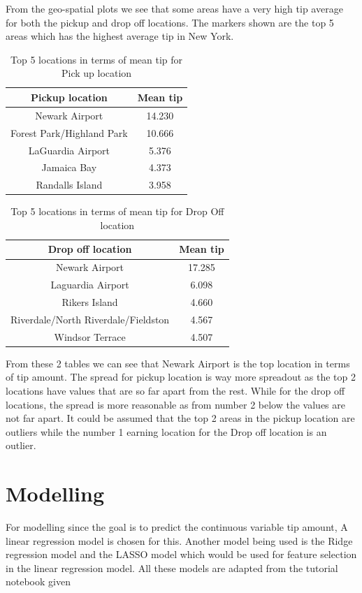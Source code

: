 \documentclass[11pt]{article}
\begin{document}
From the geo-spatial plots we see that some areas have a very high tip average for both the pickup and drop off locations. The markers shown are the top 5 areas which has the highest average tip in New York.

\begin{table}[h!]
\centering
\begin{tabular}{||c c||} 
 \hline
 Pickup location & Mean tip  \\ [0.5ex] 
 \hline\hline
 Newark Airport & 14.230 \\ 
 \hline
 Forest Park/Highland Park & 10.666 \\
 \hline
 LaGuardia Airport & 5.376\\
 \hline
 Jamaica Bay & 4.373\\
 \hline
 Randalls Island & 3.958\\ [0.5 ex] 
 \hline
\end{tabular}
\caption{Top 5 locations in terms of mean tip for Pick up location}
\end{table}

\begin{table}[h!]
\centering
\begin{tabular}{||c c||} 
 \hline
 Drop off location & Mean tip  \\ [0.5ex] 
 \hline\hline
 Newark Airport & 17.285 \\ 
 \hline
 Laguardia Airport & 6.098 \\
 \hline
 Rikers Island & 4.660\\
 \hline
 Riverdale/North Riverdale/Fieldston & 4.567\\
 \hline
 Windsor Terrace & 4.507\\ [0.5 ex] 
 \hline
\end{tabular}
\caption{Top 5 locations in terms of mean tip for Drop Off location}
\end{table}

From these 2 tables we can see that Newark Airport is the top location in terms of tip amount. The spread for pickup location is way more spreadout as the top 2 locations have values that are so far apart from the rest. While for the drop off locations, the spread is more reasonable as from number 2 below the values are not far apart. It could be assumed that the top 2 areas in the pickup location are outliers while the number 1 earning location for the Drop off location is an outlier.

\section{Modelling}
For modelling since the goal is to predict the continuous variable tip amount, A linear regression model is chosen for this. Another model being used is the Ridge regression model and the LASSO model which would be used for feature selection in the linear regression model. All these models are adapted from the tutorial notebook given\cite{modelreference}
\end{document}
